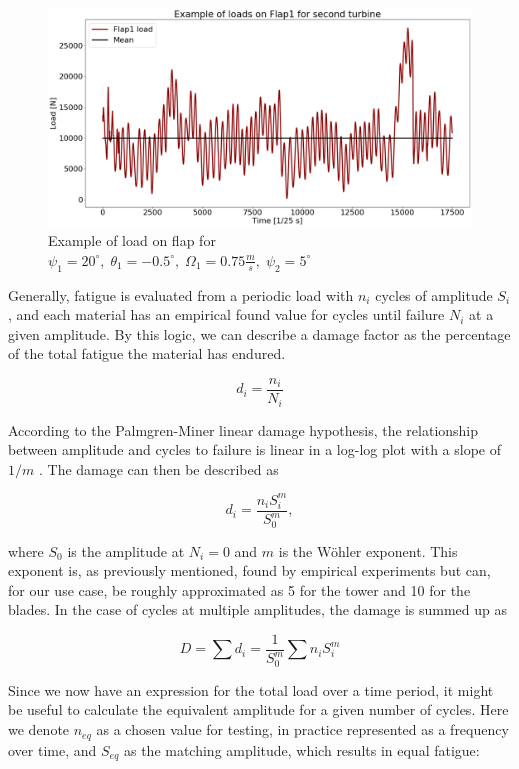 \begin{figure}[H]
    \centering
    \includegraphics[scale=0.22]{Illustrations/flap_load_example.png}
    \caption{Example of load on flap for $\psi_1 = 20^\circ, \; \theta_1 = -0.5^\circ, \; \Omega_1 = 0.75 \frac{m}{s}, \; \psi_2 = 5^\circ$}
    \label{fig:flap_load_example}
\end{figure}

Generally, fatigue is evaluated from a periodic load with $n_i$ cycles of amplitude $S_i$, and each material has an empirical found value for cycles until failure $N_i$ at a given amplitude. By this logic, we can describe a damage factor as the percentage of the total fatigue the material has endured. 

\begin{equation}
d_i=\frac{n_i}{N_i}
\end{equation}

According to the Palmgren-Miner linear damage hypothesis, the relationship between amplitude and cycles to failure is linear in a log-log plot with a slope of $1/m$ \cite{fatiguelink}. The damage can then be described as

\begin{equation}
d_i=\frac{n_i S_i^m}{S_0^m},
\end{equation}

where $S_0$ is the amplitude at $N_i=0$ and $m$ is the Wöhler exponent. This exponent is, as previously mentioned, found by empirical experiments but can, for our use case, be roughly approximated as 5 for the tower and 10 for the blades. In the case of cycles at multiple amplitudes, the damage is summed up as

\begin{equation}
D=\sum d_i=\frac{1}{S_0^m} \sum n_i S_i^m
\end{equation}

Since we now have an expression for the total load over a time period, it might be useful to calculate the equivalent amplitude for a given number of cycles. Here we denote $n_{eq}$ as a chosen value for testing, in practice represented as a frequency over time, and $S_{eq}$ as the matching amplitude, which results in equal fatigue:

